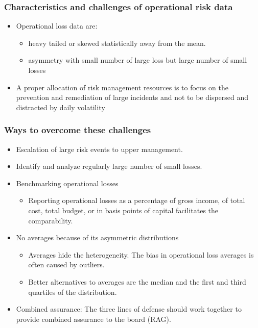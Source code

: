 \subsubsection{Characteristics and challenges of operational risk data}
\begin{itemize}
\item Operational loss data are:
    \begin{itemize}
    \item heavy tailed or skewed statistically away from the mean.
    \item asymmetry with small number of large loss but large number of small losses
    \end{itemize}
\item A proper allocation of risk management resources is to focus on the prevention and remediation of large incidents and not to be dispersed and distracted by daily volatility
\end{itemize}



\subsubsection{Ways to overcome these challenges}
\begin{itemize}
\item Escalation of large risk events to upper management.
\item Identify and analyze regularly large number of small losses.

    
\item Benchmarking operational losses
    \begin{itemize}
    \item Reporting operational losses as a percentage of gross income, of total cost, total budget, or in basis points of capital facilitates the comparability.
    
    \end{itemize}
    
\item No averages because of its asymmetric distributions
    \begin{itemize}
    \item Averages hide the heterogeneity. The bias in operational loss averages is often caused by outliers.
    \item Better alternatives to averages are the median and the first and third quartiles of the distribution.
    
    \end{itemize}
    
\item Combined assurance: The three lines of defense should work together to provide combined assurance to the board (RAG).

\end{itemize}




